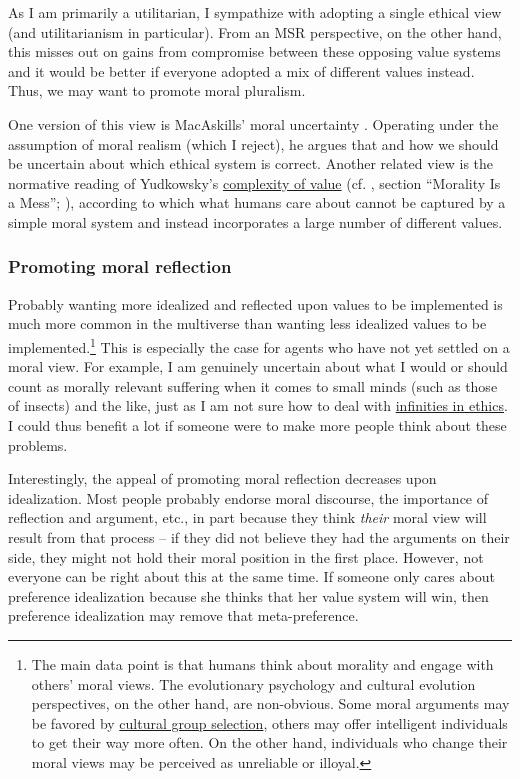 As I am primarily a utilitarian, I sympathize with adopting a single
ethical view (and utilitarianism in particular). From an MSR
perspective, on the other hand, this misses out on gains from compromise
between these opposing value systems and it would be better if everyone
adopted a mix of different values instead. Thus, we may want to promote
moral pluralism.

One version of this view is MacAskills' 
moral uncertainty \citeyear{MacAskill2014-ca}. Operating under the assumption of moral realism
(which I reject), he argues that and how we should be uncertain about
which ethical system is correct. Another related view is the normative
reading of Yudkowsky's
\href{https://wiki.lesswrong.com/wiki/Complexity_of_value}{complexity
of value} (cf. \citet{Stewart-Williams2015-gg}, section
``Morality Is a Mess''; \cite{Muehlhauser2012-ib}),
according to which what humans care about cannot be captured by a simple
moral system and instead incorporates a large number of different
values.

\subsubsection{Promoting moral
reflection}\label{promoting-moral-reflection}

Probably wanting more idealized and reflected upon values to be
implemented is much more common in the multiverse than wanting less
idealized values to be implemented.\footnote{The main data point is that
  humans think about morality and engage with others' moral views. The
  evolutionary psychology and cultural evolution perspectives, on the
  other hand, are non-obvious. Some moral arguments may be favored by
  \href{https://en.wikipedia.org/wiki/Cultural_group_selection}{cultural
  group selection}, others may offer intelligent individuals to get
  their way more often. On the other hand, individuals who change their
  moral views may be perceived as unreliable or illoyal.} This is
especially the case for agents who have not yet settled on a moral view.
For example, I am genuinely uncertain about what I would or should count
as morally relevant suffering when it comes to small minds (such as
those of insects) and the like, just as I am not sure how to deal with
\href{https://foundational-research.org/infinity-in-ethics/}{infinities
in ethics}. I could thus benefit a lot if someone were to make more
people think about these problems.

Interestingly, the appeal of promoting moral reflection decreases upon
idealization. Most people probably endorse moral discourse, the
importance of reflection and argument, etc., in part because they think
\emph{their} moral view will result from that process -- if they did not
believe they had the arguments on their side, they might not hold their
moral position in the first place. However, not everyone can be right
about this at the same time. If someone only cares about preference
idealization because she thinks that her value system will win, then
preference idealization may remove that meta-preference.

